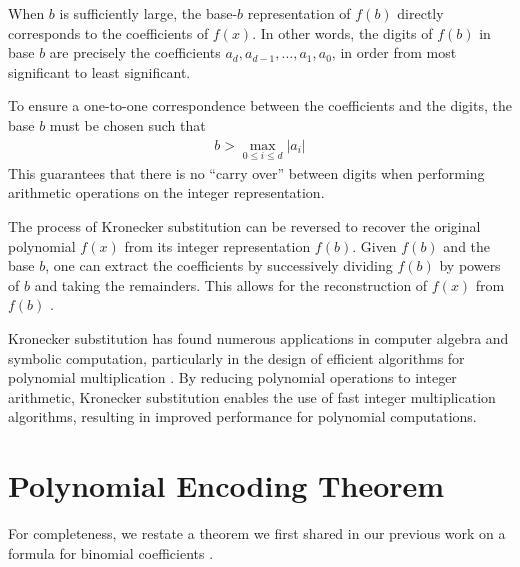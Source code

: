 \documentclass[12pt,reqno]{article}
\theoremstyle{plain}
\theoremstyle{definition}
\begin{document}
When $b$ is sufficiently large, the base-$b$ representation of $f(b)$ directly corresponds to the coefficients of $f(x)$. In other words, the digits of $f(b)$ in base $b$ are precisely the coefficients $a_d, a_{d-1}, \ldots, a_1, a_0$, in order from most significant to least significant.

To ensure a one-to-one correspondence between the coefficients and the digits, the base $b$ must be chosen such that
\begin{align*}
    b > \max_{0 \leq i \leq d} |a_i|
\end{align*}
This guarantees that there is no ``carry over'' between digits when performing arithmetic operations on the integer representation.

The process of Kronecker substitution can be reversed to recover the original polynomial $f(x)$ from its integer representation $f(b)$. Given $f(b)$ and the base $b$, one can extract the coefficients by successively dividing $f(b)$ by powers of $b$ and taking the remainders. This allows for the reconstruction of $f(x)$ from $f(b)$ \cite{grimaldi2004discrete}.

Kronecker substitution has found numerous applications in computer algebra and symbolic computation, particularly in the design of efficient algorithms for polynomial multiplication \cite{harvey2009kronecker, harvey2014faster}. By reducing polynomial operations to integer arithmetic, Kronecker substitution enables the use of fast integer multiplication algorithms, resulting in improved performance for polynomial computations.

\section{Polynomial Encoding Theorem}
For completeness, we restate a theorem we first shared in our previous work on a formula for binomial coefficients \cite{shunia2023simple}.
\end{document}
